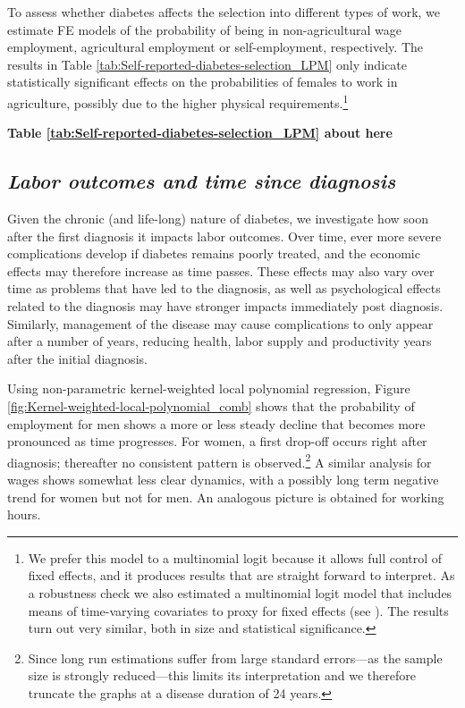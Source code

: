 \documentclass[12pt,english]{article}
\begin{document}
To assess whether diabetes affects the selection into different types of work, we estimate \ac{FE} models of the probability of being in non-agricultural wage employment, agricultural employment or self-employment, respectively. The results in Table \ref{tab:Self-reported-diabetes-selection_LPM} only indicate statistically significant effects on the probabilities of females to work in agriculture, possibly due to the higher physical requirements.\footnote{We prefer this model to a multinomial logit because it allows full control of fixed effects, and it produces results that are straight forward to interpret. As a robustness check we also estimated a multinomial logit model that includes means of time-varying covariates to proxy for fixed effects (see \textcite{Mundlak1978,Bell2015}). The results turn out very similar, both in size and statistical significance.}

\begin{center}
	\textbf{Table \ref{tab:Self-reported-diabetes-selection_LPM} about here}
\end{center}

\subsection{\label{sec:duration}\textit{Labor outcomes and time since diagnosis}}

Given the chronic (and life-long) nature of diabetes, we investigate how soon after the first diagnosis it impacts labor outcomes. Over time, ever more severe complications develop if diabetes remains poorly treated, and the economic effects may therefore increase as time passes. These effects may also vary over time as problems that have led to the diagnosis, as well as psychological effects related to the diagnosis may have stronger impacts immediately post diagnosis. Similarly, management of the disease may cause complications to only appear after a number of years, reducing health, labor supply and productivity years after the initial diagnosis.


Using non-parametric kernel-weighted local polynomial regression, Figure \ref{fig:Kernel-weighted-local-polynomial_comb} shows that the probability of employment for men shows a more or less steady decline that becomes more pronounced as time progresses. For women,
a first drop-off occurs right after diagnosis; thereafter no consistent pattern is observed.\footnote{Since long run estimations suffer from large standard errors---as the sample size is strongly reduced---this limits its interpretation and we therefore truncate the graphs at a disease duration of 24 years.} A similar analysis for wages shows somewhat less clear dynamics, with a possibly long term negative trend for women but not for men. An analogous picture is obtained for working hours.
\end{document}
